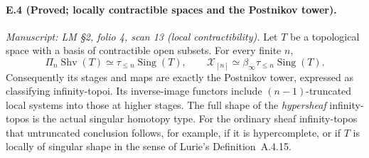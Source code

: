 \paragraph{E.4 (Proved; locally contractible spaces and the Postnikov tower).}
\textit{Manuscript: LM \S2, folio 4, scan 13 (local contractibility).}
Let $T$ be a topological space with a basis of contractible open subsets. For every finite $n$,
\[
 \Pi_n\operatorname{Shv}(T)
       \simeq\tau_{\le n}\operatorname{Sing}(T),
 \qquad
 \mathcal X_{[n]}\simeq
       \beta_\infty\tau_{\le n}\operatorname{Sing}(T).
                                                        \tag{E.4.1}
\]
Consequently its stages and maps are exactly the Postnikov tower, expressed as classifying infinity-topoi. Its inverse-image functors include $(n-1)$-truncated local systems into those at higher stages. The full shape of the \emph{hypersheaf} infinity-topos is the actual singular homotopy type. For the ordinary sheaf infinity-topos that untruncated conclusion follows, for example, if it is hypercomplete, or if $T$ is locally of singular shape in the sense of Lurie's Definition~A.4.15.
